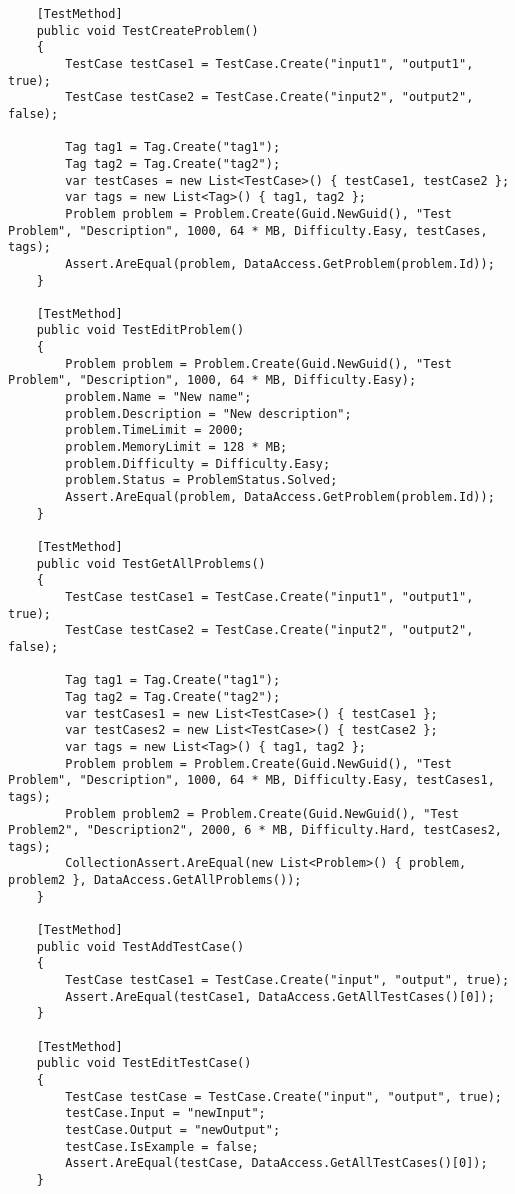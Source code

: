 \documentclass[report.tex]{subfiles}
\begin{document}
\begin{verbatim}
    [TestMethod]
    public void TestCreateProblem()
    {
        TestCase testCase1 = TestCase.Create("input1", "output1", true);
        TestCase testCase2 = TestCase.Create("input2", "output2", false);

        Tag tag1 = Tag.Create("tag1");
        Tag tag2 = Tag.Create("tag2");
        var testCases = new List<TestCase>() { testCase1, testCase2 };
        var tags = new List<Tag>() { tag1, tag2 };
        Problem problem = Problem.Create(Guid.NewGuid(), "Test Problem", "Description", 1000, 64 * MB, Difficulty.Easy, testCases, tags);
        Assert.AreEqual(problem, DataAccess.GetProblem(problem.Id));
    }

    [TestMethod]
    public void TestEditProblem()
    {
        Problem problem = Problem.Create(Guid.NewGuid(), "Test Problem", "Description", 1000, 64 * MB, Difficulty.Easy);
        problem.Name = "New name";
        problem.Description = "New description";
        problem.TimeLimit = 2000;
        problem.MemoryLimit = 128 * MB;
        problem.Difficulty = Difficulty.Easy;
        problem.Status = ProblemStatus.Solved;
        Assert.AreEqual(problem, DataAccess.GetProblem(problem.Id));
    }

    [TestMethod]
    public void TestGetAllProblems()
    {
        TestCase testCase1 = TestCase.Create("input1", "output1", true);
        TestCase testCase2 = TestCase.Create("input2", "output2", false);

        Tag tag1 = Tag.Create("tag1");
        Tag tag2 = Tag.Create("tag2");
        var testCases1 = new List<TestCase>() { testCase1 };
        var testCases2 = new List<TestCase>() { testCase2 };
        var tags = new List<Tag>() { tag1, tag2 };
        Problem problem = Problem.Create(Guid.NewGuid(), "Test Problem", "Description", 1000, 64 * MB, Difficulty.Easy, testCases1, tags);
        Problem problem2 = Problem.Create(Guid.NewGuid(), "Test Problem2", "Description2", 2000, 6 * MB, Difficulty.Hard, testCases2, tags);
        CollectionAssert.AreEqual(new List<Problem>() { problem, problem2 }, DataAccess.GetAllProblems());
    }

    [TestMethod]
    public void TestAddTestCase()
    {
        TestCase testCase1 = TestCase.Create("input", "output", true);
        Assert.AreEqual(testCase1, DataAccess.GetAllTestCases()[0]);
    }

    [TestMethod]
    public void TestEditTestCase()
    {
        TestCase testCase = TestCase.Create("input", "output", true);
        testCase.Input = "newInput";
        testCase.Output = "newOutput";
        testCase.IsExample = false;
        Assert.AreEqual(testCase, DataAccess.GetAllTestCases()[0]);
    }


\end{verbatim}
\end{document}
